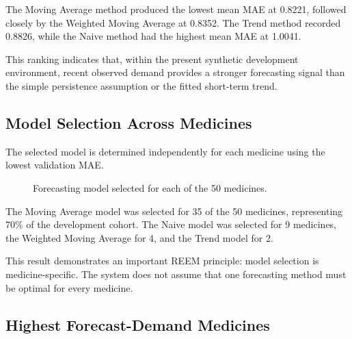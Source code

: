 \documentclass[11pt,a4paper]{article}
\begin{document}
The Moving Average method produced the lowest mean MAE at 0.8221,
followed closely by the Weighted Moving Average at 0.8352. The Trend method
recorded 0.8826, while the Naive method had the highest mean MAE at 1.0041.

This ranking indicates that, within the present synthetic development
environment, recent observed demand provides a stronger forecasting signal
than the simple persistence assumption or the fitted short-term trend.

\subsection{Model Selection Across Medicines}

The selected model is determined independently for each medicine using the
lowest validation MAE.

\begin{figure}[H]
\centering
{}
\caption{Forecasting model selected for each of the 50 medicines.}
\label{fig:model-selection}
\end{figure}

The Moving Average model was selected for 35 of the 50 medicines,
representing 70\% of the development cohort. The Naive model was selected
for 9 medicines, the Weighted Moving Average for 4, and the Trend model for
2.

This result demonstrates an important REEM principle: model selection is
medicine-specific. The system does not assume that one forecasting method
must be optimal for every medicine.

\subsection{Highest Forecast-Demand Medicines}
\end{document}
